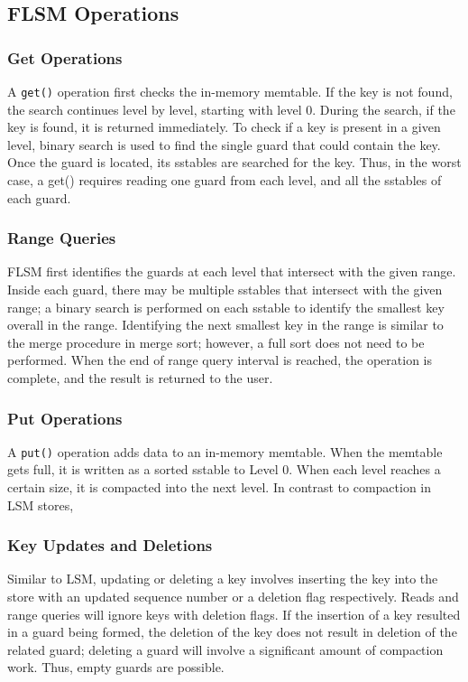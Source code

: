 \documentclass[11pt]{article}
\begin{document}
\subsection{FLSM Operations}
\label{sec:org9d6c921}
\subsubsection{Get Operations}
\label{sec:orgd41f092}
A \texttt{get()} operation first checks the in-memory memtable. If the key is not found, the search continues
level by level, starting with level 0. During the search, if the key is found, it is returned
immediately. To check if a key is present in a given level, binary search is used to find the single
guard that could contain the key. Once the guard is located, its sstables are searched for the key.
Thus, in the worst case, a get() requires reading one guard from each level, and all the sstables of
each guard.
\subsubsection{Range Queries}
\label{sec:org1947120}
FLSM first identifies the guards at each level that intersect with the given range. Inside each guard,
there may be multiple sstables that intersect with the given range; a binary search is performed on
each sstable to identify the smallest key overall in the range. Identifying the next smallest key in
the range is similar to the merge procedure in merge sort; however, a full sort does not need to be
performed. When the end of range query interval is reached, the operation is complete, and the result
is returned to the user.
\subsubsection{Put Operations}
\label{sec:orgd8a6dc4}
A \texttt{put()} operation adds data to an in-memory memtable. When the memtable gets full, it is written as a
sorted sstable to Level 0. When each level reaches a certain size, it is compacted into the next
level. In contrast to compaction in LSM stores,
\subsubsection{Key Updates and Deletions}
\label{sec:org28ec4a5}
Similar to LSM, updating or deleting a key involves inserting the key into the store with an updated
sequence number or a deletion flag respectively. Reads and range queries will ignore keys with
deletion flags. If the insertion of a key resulted in a guard being formed, the deletion of the key
does not result in deletion of the related guard; deleting a guard will involve a significant amount
of compaction work. Thus, empty guards are possible.
\end{document}
